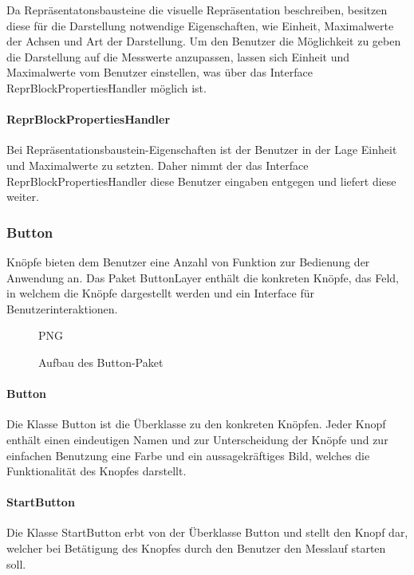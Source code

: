 \documentclass[parskip=full]{scrartcl}
\begin{document}
Da Repräsentatonsbausteine die visuelle Repräsentation beschreiben, besitzen diese für die Darstellung notwendige Eigenschaften, wie Einheit, Maximalwerte der Achsen und Art der Darstellung. Um den Benutzer die Möglichkeit zu geben die Darstellung auf die Messwerte anzupassen, lassen sich Einheit und Maximalwerte vom Benutzer einstellen, was über das Interface ReprBlockPropertiesHandler möglich ist.

\paragraph{ReprBlockPropertiesHandler}

Bei Repräsentationsbaustein-Eigenschaften ist der Benutzer in der Lage Einheit und Maximalwerte zu setzten. Daher nimmt der das Interface ReprBlockPropertiesHandler diese Benutzer eingaben entgegen und liefert diese weiter.


\newpage

\subsubsection{Button}

Knöpfe bieten dem Benutzer eine Anzahl von Funktion zur Bedienung der Anwendung an. Das Paket ButtonLayer enthält die konkreten Knöpfe, das Feld, in welchem die Knöpfe dargestellt werden und ein Interface für Benutzerinteraktionen.

\begin{figure}[htbp]
	\begin{center}
PNG
		\caption{Aufbau des Button-Paket}
		\label{Entwurf_Grob}
	\end{center}
\end{figure}

\paragraph{Button}

Die Klasse Button ist die Überklasse zu den konkreten Knöpfen. Jeder Knopf enthält einen eindeutigen Namen und zur Unterscheidung der Knöpfe und zur einfachen Benutzung eine Farbe und ein aussagekräftiges Bild, welches die Funktionalität des Knopfes darstellt.

\paragraph{StartButton}

Die Klasse StartButton erbt von der Überklasse Button und stellt den Knopf dar, welcher bei Betätigung des Knopfes durch den Benutzer den Messlauf starten soll.
\end{document}
